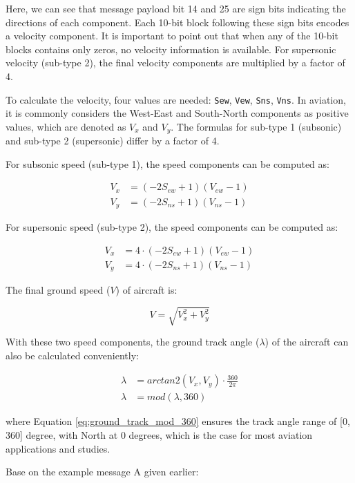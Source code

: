 Here, we can see that message payload bit 14 and 25 are sign bits indicating the directions of each component. Each 10-bit block following these sign bits encodes a velocity component. It is important to point out that when any of the 10-bit blocks contains only zeros, no velocity information is available. For supersonic velocity (sub-type 2), the final velocity components are multiplied by a factor of 4.

To calculate the velocity, four values are needed: \texttt{Sew}, \texttt{Vew},  \texttt{Sns}, \texttt{Vns}. In aviation, it is commonly considers the West-East and South-North components as positive values, which are denoted as $V_x$ and $V_y$. The formulas for sub-type 1 (subsonic) and sub-type 2 (supersonic) differ by a factor of 4.

For subsonic speed (sub-type 1), the speed components can be computed as:

\begin{align}
  V_x &= (-2S_{ew} + 1) (V_{ew} - 1) \\
  V_y &= (-2S_{ns} + 1) (V_{ns} - 1)
\end{align}

For supersonic speed (sub-type 2), the speed components can be computed as:

\begin{align}
  V_x &= 4 \cdot (-2S_{ew} + 1) (V_{ew} - 1)\\
  V_y &= 4 \cdot (-2S_{ns} + 1) (V_{ns} - 1)
\end{align}


The final ground speed ($V$) of aircraft is:

\begin{equation}
  V = \sqrt{V_x^2 + V_y^2}
\end{equation}

With these two speed components, the ground track angle ($\lambda$) of the aircraft can also be calculated conveniently:

\begin{align}
  \lambda &= arctan2 \left( V_x, V_y \right) \cdot \frac{360}{2\pi} \\
  \lambda &= mod(\lambda, 360) \label{eq:ground_track_mod_360}
\end{align}

where Equation \ref{eq:ground_track_mod_360} ensures the track angle range of [0, 360] degree, with North at 0 degrees, which is the case for most aviation applications and studies.

Base on the example message A given earlier:

